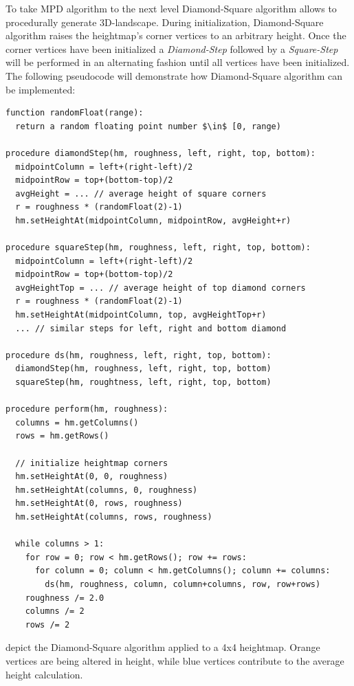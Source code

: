 \documentclass[11pt,a4paper,twoside,openright]{report}
\begin{document}
\noindent To take MPD algorithm to the next level Diamond-Square algorithm allows to procedurally generate 3D-landscape. During initialization, Diamond-Square algorithm raises the heightmap's corner vertices to an arbitrary height. Once the corner vertices have been initialized a \emph{Diamond-Step} followed by a \emph{Square-Step} will be performed in an alternating fashion until all vertices have been initialized. The following pseudocode will demonstrate how Diamond-Square algorithm can be implemented:

\begin{lstlisting}[caption=DS pseudocode, mathescape=true]
function randomFloat(range):
  return a random floating point number $\in$ [0, range)

procedure diamondStep(hm, roughness, left, right, top, bottom):
  midpointColumn = left+(right-left)/2
  midpointRow = top+(bottom-top)/2
  avgHeight = ... // average height of square corners
  r = roughness * (randomFloat(2)-1)
  hm.setHeightAt(midpointColumn, midpointRow, avgHeight+r)

procedure squareStep(hm, roughness, left, right, top, bottom):
  midpointColumn = left+(right-left)/2
  midpointRow = top+(bottom-top)/2
  avgHeightTop = ... // average height of top diamond corners
  r = roughness * (randomFloat(2)-1)
  hm.setHeightAt(midpointColumn, top, avgHeightTop+r)
  ... // similar steps for left, right and bottom diamond

procedure ds(hm, roughness, left, right, top, bottom):
  diamondStep(hm, roughness, left, right, top, bottom)
  squareStep(hm, roughtness, left, right, top, bottom)

procedure perform(hm, roughness):
  columns = hm.getColumns()
  rows = hm.getRows()

  // initialize heightmap corners
  hm.setHeightAt(0, 0, roughness)
  hm.setHeightAt(columns, 0, roughness)
  hm.setHeightAt(0, rows, roughness)
  hm.setHeightAt(columns, rows, roughness)

  while columns > 1:
    for row = 0; row < hm.getRows(); row += rows:
      for column = 0; column < hm.getColumns(); column += columns:
        ds(hm, roughness, column, column+columns, row, row+rows)
    roughness /= 2.0
    columns /= 2
    rows /= 2
\end{lstlisting}

\noindent {} depict the Diamond-Square algorithm applied to a 4x4 heightmap. Orange vertices are being altered in height, while blue vertices contribute to the average height calculation.
\end{document}
